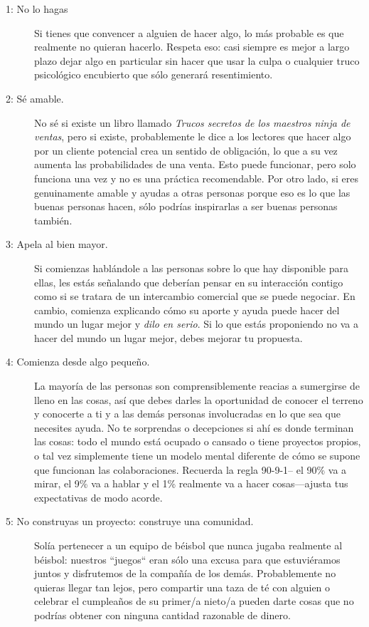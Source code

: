 \begin{description}
\item[1: No lo hagas]

Si tienes que convencer a alguien de hacer algo,
lo más probable es que realmente no quieran hacerlo.
Respeta eso:
casi siempre es mejor a largo plazo dejar algo en particular sin hacer 
que usar la culpa o cualquier truco psicológico encubierto que sólo generará resentimiento.


\item[2: Sé amable.]
No sé si existe un libro llamado
 \emph{Trucos secretos de los maestros ninja de ventas},
pero si existe,
probablemente le dice a los lectores que hacer algo por un cliente potencial 
crea un sentido de obligación,
lo que a su vez aumenta las probabilidades de una venta.
Esto puede funcionar, pero solo funciona una vez y no es una práctica recomendable.
Por otro lado,
si eres genuinamente amable
y ayudas a otras personas porque eso es lo que las buenas personas hacen,
sólo podrías inspirarlas a ser buenas personas también.

\item[3: Apela al bien mayor.]
Si comienzas hablándole a las personas sobre lo que hay disponible para ellas,
les estás señalando que deberían pensar en su interacción contigo
como si se tratara de  un intercambio comercial que se puede negociar.
En cambio,
comienza explicando cómo su aporte y ayuda puede hacer del mundo un lugar mejor 
y \emph{dilo en serio}.
Si lo que estás proponiendo no va a hacer del mundo un lugar mejor,
debes mejorar tu propuesta.


\item[4: Comienza desde algo pequeño.]
La mayoría de las personas son comprensiblemente reacias a sumergirse de lleno en las cosas, 
así que debes darles  la oportunidad de conocer el terreno 
y conocerte a ti y a las demás personas involucradas
 en lo que sea que necesites ayuda.
No te sorprendas o decepciones si ahí es donde terminan las cosas:
todo el mundo está ocupado o cansado o tiene proyectos propios,
o tal vez simplemente tiene un modelo mental diferente de cómo se supone que funcionan las colaboraciones.
Recuerda la regla  90-9-1-- el 90\% va a mirar, el 9\% va a hablar y el 1\% 
realmente va a hacer cosas---ajusta tus expectativas de modo acorde.

\item[5: No construyas un proyecto: construye una comunidad.]
Solía pertenecer a un equipo de béisbol que nunca jugaba realmente al béisbol:
nuestros ``juegos`` eran sólo una excusa para que estuviéramos juntos y disfrutemos de la compañía de los demás.
Probablemente no quieras llegar tan lejos,
pero compartir una taza de té con alguien o celebrar el cumpleaños de su primer/a nieto/a
pueden darte cosas que no podrías obtener con ninguna cantidad razonable de dinero.


\end{description}
